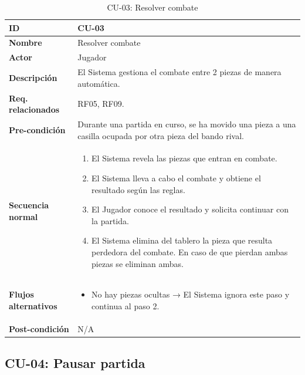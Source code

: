 \begin{table}[H]
	\centering
	\begin{tabular}{|p{3cm}|p{14cm}|}
		\hline \textbf{ID} & CU-03 \\
		\hline \textbf{Nombre} & Resolver combate \\
		\hline \textbf{Actor} & Jugador \\
		\hline \textbf{Descripción} & El Sistema gestiona el combate entre 2 piezas de manera automática. \\
		\hline \textbf{Req. relacionados} & RF05, RF09. \\
		\hline \textbf{Pre-condición} & Durante una partida en curso, se ha movido una pieza a una casilla ocupada por otra pieza del bando rival. \\
		\hline
		\textbf{Secuencia normal} &
		\begin{enumerate}[nosep, before=\vspace{-0.4\baselineskip}]
			\item El Sistema revela las piezas que entran en combate.
			\item El Sistema lleva a cabo el combate y obtiene el resultado según las reglas.
			\item El Jugador conoce el resultado y solicita continuar con la partida.
			\item El Sistema elimina del tablero la pieza que resulta perdedora del combate. En caso de que pierdan ambas piezas se eliminan ambas.
		\end{enumerate} \\
		\hline
		\textbf{Flujos alternativos} &
		\begin{itemize}[nosep, before=\vspace{-0.4\baselineskip}]
			\item [{1.a.}] No hay piezas ocultas → El Sistema ignora este paso y continua al paso 2.
		\end{itemize} \\
		\hline \textbf{Post-condición} & N/A \\
		\hline
	\end{tabular}
	\caption{CU-03: Resolver combate}
	\label{tab:cu03}
\end{table}

\clearpage


\subsection{CU-04: Pausar partida}

